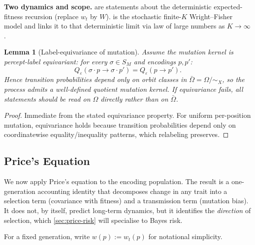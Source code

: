 \documentclass[12pt]{article}
\newtheorem{lemma}[theorem]{Lemma}
\newcommand{\Qeps}{Q_\varepsilon}
\newcommand{\Obar}{\bar{\Omega}}
\newcommand{\SM}{S_M}
\begin{document}
\textbf{Two dynamics and scope.}  are statements about the deterministic expected-fitness recursion (replace $w_t$ by $W$).  is the stochastic finite-$K$ Wright--Fisher model and links it to that deterministic limit via law of large numbers as $K \to \infty$.

\begin{lemma}[Label-equivariance of mutation]\label{lem:equivariance}
Assume the mutation kernel is percept-label equivariant: for every $\sigma \in \SM$ and encodings $p, p'$:
\begin{equation}
\Qeps(\sigma \cdot p \to \sigma \cdot p') = \Qeps(p \to p').
\end{equation}
Hence transition probabilities depend only on orbit classes in $\Obar = \Omega/{\sim_X}$, so the process admits a well-defined quotient mutation kernel. If equivariance fails, all statements should be read on $\Omega$ directly rather than on $\Obar$.
\end{lemma}

\begin{proof}
Immediate from the stated equivariance property. For uniform per-position mutation, equivariance holds because transition probabilities depend only on coordinatewise equality/inequality patterns, which relabeling preserves.
\end{proof}

\subsection{Price's Equation}\label{sec:price}

We now apply Price's equation \citep{price_1970,price_1972} to the encoding population. The result is a one-generation accounting identity that decomposes change in any trait into a selection term (covariance with fitness) and a transmission term (mutation bias). It does not, by itself, predict long-term dynamics, but it identifies the \emph{direction} of selection, which \cref{sec:price-risk} will specialise to Bayes risk.

For a fixed generation, write $w(p) := w_t(p)$ for notational simplicity.
\end{document}

